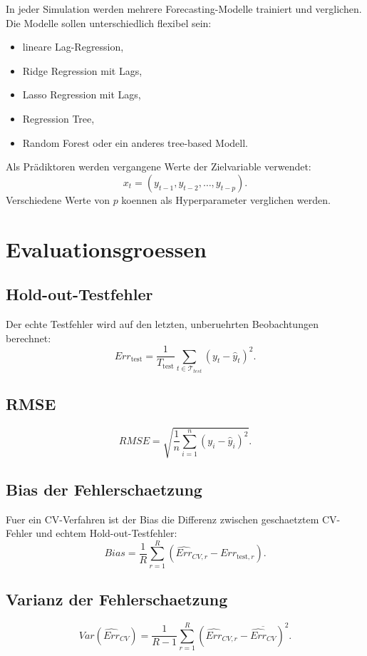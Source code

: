 \documentclass[11pt,a4paper]{article}
\begin{document}
In jeder Simulation werden mehrere Forecasting-Modelle trainiert und verglichen.
Die Modelle sollen unterschiedlich flexibel sein:

\begin{itemize}
  \item lineare Lag-Regression,
  \item Ridge Regression mit Lags,
  \item Lasso Regression mit Lags,
  \item Regression Tree,
  \item Random Forest oder ein anderes tree-based Modell.
\end{itemize}

Als Prädiktoren werden vergangene Werte der Zielvariable verwendet:
\[
  x_t = (y_{t-1}, y_{t-2}, \ldots, y_{t-p}).
\]
Verschiedene Werte von $p$ koennen als Hyperparameter verglichen werden.

\section{Evaluationsgroessen}

\subsection{Hold-out-Testfehler}
Der echte Testfehler wird auf den letzten, unberuehrten Beobachtungen berechnet:
\[
  Err_{\text{test}}
  =
  \frac{1}{T_{\text{test}}}
  \sum_{t \in \mathcal{T}_{test}}
  (y_t - \hat{y}_t)^2.
\]

\subsection{RMSE}
\[
  RMSE =
  \sqrt{
  \frac{1}{n}
  \sum_{i=1}^{n}
  (y_i - \hat{y}_i)^2
  }.
\]

\subsection{Bias der Fehlerschaetzung}
Fuer ein CV-Verfahren ist der Bias die Differenz zwischen geschaetztem
CV-Fehler und echtem Hold-out-Testfehler:
\[
  Bias =
  \frac{1}{R}
  \sum_{r=1}^{R}
  \left(
  \widehat{Err}_{CV,r} - Err_{\text{test},r}
  \right).
\]

\subsection{Varianz der Fehlerschaetzung}
\[
  Var(\widehat{Err}_{CV})
  =
  \frac{1}{R-1}
  \sum_{r=1}^{R}
  \left(
  \widehat{Err}_{CV,r}
  - \overline{\widehat{Err}_{CV}}
  \right)^2.
\]
\end{document}
